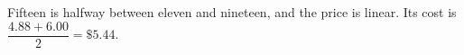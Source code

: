 Fifteen is halfway between eleven and nineteen, and the price is linear. Its cost is $\dfrac{4.88+6.00}{2}=\boxed{\$5.44}$.
